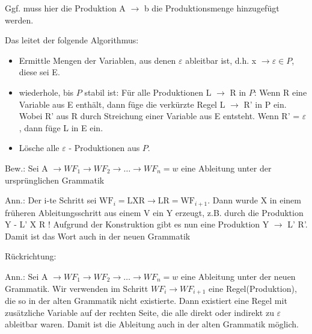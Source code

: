 \documentclass[11pt, a4paper]{article}
\begin{document}
\begin{flushleft}
\begin{tcolorbox}[title = Satz 1.1 Beweis, colbacktitle = white, coltitle = black, colframe = black, colback = white, fonttitle = \bfseries]
        Ggf. muss hier die Produktion A \(\rightarrow\) b die Produktionsmenge hinzugefügt werden.

        Das leitet der folgende Algorithmus:

        \begin{flushleft}
            \begin{itemize}[-]
                \item Ermittle Mengen der Variablen, aus denen \(\varepsilon\) ableitbar ist, d.h. x \(\rightarrow \varepsilon \in P\), diese sei E.
                \item wiederhole, bis \(P\) stabil ist: \linebreak Für alle Produktionen L \(\rightarrow\) R in \(P\): \linebreak Wenn R eine Variable aus E enthält, dann füge die verkürzte Regel L \(\rightarrow\) R' in P ein. Wobei R' aus R durch Streichung einer Variable aus E entsteht. \linebreak Wenn R' = \(\varepsilon\), dann füge L in E ein.
                \item Lösche alle \(\varepsilon\) - Produktionen aus \(P\).
            \end{itemize}

            Bew.: Sei A \(\rightarrow WF_1 \rightarrow WF_2 \rightarrow \ldots \rightarrow WF_n = w\) eine Ableitung unter der ursprünglichen Grammatik

            Ann.: Der i-te Schritt sei \(\text{WF}_i = \text{LXR} \rightarrow \text{LR} = \text{WF}_{i+1}\). Dann wurde X in einem früheren Ableitungsschritt aus einem V ein Y erzeugt, z.B. durch die Produktion Y - L' X R ! Aufgrund der Konstruktion gibt es nun eine Produktion Y \(\rightarrow\) L' R'. Damit ist das Wort auch in der neuen Grammatik



        \end{flushleft}
    \end{tcolorbox}

    Rückrichtung:

    Ann.: Sei A \(\rightarrow WF_1 \rightarrow WF_2 \rightarrow \ldots \rightarrow WF_n = w\) eine Ableitung unter der neuen Grammatik. Wir verwenden im Schritt \(WF_i \rightarrow WF_{i+1}\) eine Regel(Produktion), die so in der alten Grammatik nicht existierte. Dann existiert eine Regel mit zusätzliche Variable auf der rechten Seite, die alle direkt oder indirekt zu \(\varepsilon\) ableitbar waren. Damit ist die Ableitung auch in der alten Grammatik möglich.


\end{flushleft}
\end{document}
